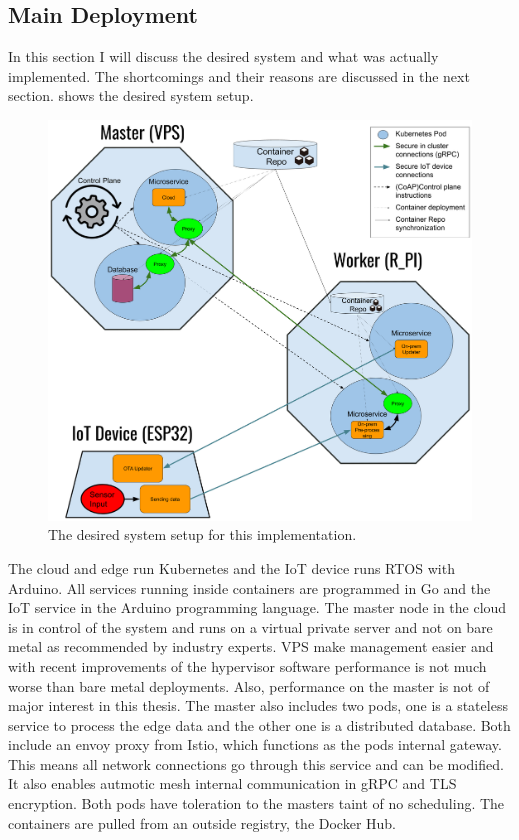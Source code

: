 \subsection{Main Deployment} \label{sec:mainDeployment}
In this section I will discuss the desired system and what was actually implemented. The shortcomings and their reasons are discussed in the next section.
 shows the desired system setup.
\begin{figure}
    \centering
    \includegraphics[scale=0.25]{figures/implementationSetup.png}
    \caption{The desired system setup for this implementation.}
    \label{fig:implementationSetup}
\end{figure}
The cloud and edge run Kubernetes and the IoT device runs RTOS with Arduino. All services running inside containers are programmed in Go and the IoT service in the Arduino programming language. 
The master node in the cloud is in control of the system and runs on a virtual private server and not on bare metal as recommended by industry experts. VPS make management easier and with recent improvements of the hypervisor software performance is not much worse than bare metal deployments. Also, performance on the master is not of major interest in this thesis. The master also includes two pods, one is a stateless service to process the edge data and the other one is a distributed database. Both include an envoy proxy from Istio, which functions as the pods internal gateway. This means all network connections go through this service and can be modified. It also enables autmotic mesh internal communication in gRPC and TLS encryption. Both pods have toleration to the masters taint of no scheduling. The containers are pulled from an outside registry, the Docker Hub.\\
